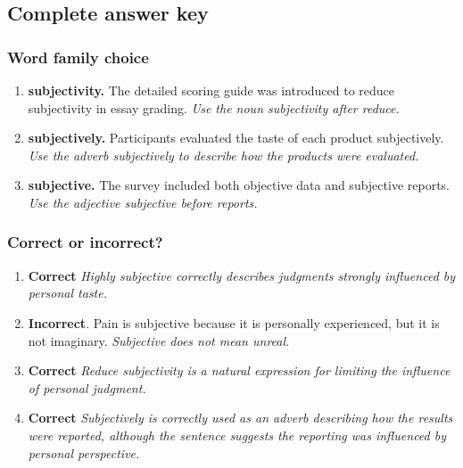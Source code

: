 \documentclass[11pt]{article}
\begin{document}
\subsection{Complete answer key}
\subsubsection{Word family choice}
\begin{enumerate}
  \item \textbf{subjectivity.} The detailed scoring guide was introduced to reduce subjectivity in essay grading. \emph{Use the noun subjectivity after reduce.}
  \item \textbf{subjectively.} Participants evaluated the taste of each product subjectively. \emph{Use the adverb subjectively to describe how the products were evaluated.}
  \item \textbf{subjective.} The survey included both objective data and subjective reports. \emph{Use the adjective subjective before reports.}
\end{enumerate}

\subsubsection{Correct or incorrect?}
\begin{enumerate}
  \item \textbf{Correct} \emph{Highly subjective correctly describes judgments strongly influenced by personal taste.}
  \item \textbf{Incorrect}. Pain is subjective because it is personally experienced, but it is not imaginary. \emph{Subjective does not mean unreal.}
  \item \textbf{Correct} \emph{Reduce subjectivity is a natural expression for limiting the influence of personal judgment.}
  \item \textbf{Correct} \emph{Subjectively is correctly used as an adverb describing how the results were reported, although the sentence suggests the reporting was influenced by personal perspective.}
\end{enumerate}
\end{document}
